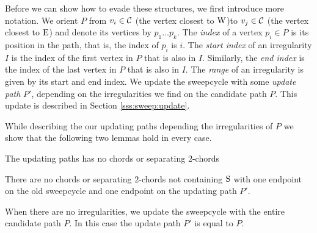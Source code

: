   Before we can show how to evade these structures, we first introduce more notation. We orient $P$ from $v_i \in \mathcal{C}$ (the vertex closest to $\mathrm{W}$)to $v_j \in \mathcal{C}$ (the vertex closest to $\mathrm{E}$) and denote its vertices by $p_1 \ldots p_k$.
  The \emph{index} of a vertex $p_i \in P$ is its position in the path, that is, the index of $p_i$ is $i$.
  The \emph{start index} of an irregularity $I$ is the index of the first vertex in $P$ that is also in $I$. Similarly, the \emph{end index} is the index of the last vertex in $P$ that is also in $I$.
  The \emph{range} of an irregularity is given by its start and end index. We update the sweepcycle with some \emph{update path} $P'$, depending on the irregularities we find on the candidate path $P$. This update is described in Section \ref{sss:sweep:update}.

  While describing the our updating paths depending the irregularities of $P$ we show that the following two lemmas hold in every case.

  \begin{lemma}
    The updating paths has no chords or separating $2$-chords
    \label{lm:sweep:augNoIregularity}
  \end{lemma}

  \begin{lemma}
    \label{lm:sweep:noConnectingIregularity}
    There are no chords or separating $2$-chords not containing $\mathrm{S}$ with one endpoint on the old sweepcycle and one endpoint on the updating path $P'$.
  \end{lemma}

    When there are no irregularities, we update the sweepcycle with the entire candidate path $P$.
    In this case the update path $P'$ is equal to $P$.

